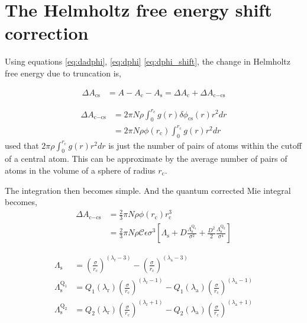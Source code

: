 \documentclass[english]{../thermomemo/thermomemo}
\newcommand*{\lb}{\left(}
\newcommand*{\rb}{\right)}
\newcommand{\lama}{\ensuremath{{\lambda_{\text{a}}}}\xspace}
\newcommand{\lamr}{\ensuremath{{\lambda_{\text{r}}}}\xspace}
\newcommand{\cut}{\ensuremath{\text{c}}\xspace}
\newcommand{\cs}{\ensuremath{\text{cs}}\xspace}
\newcommand{\shift}{\ensuremath{\text{s}}\xspace}
\newcommand{\Qone}{\ensuremath{\text{Q}_1}\xspace}
\newcommand{\Qtwo}{\ensuremath{\text{Q}_2}\xspace}
\begin{document}
\section{The Helmholtz free energy shift correction}

Using equations \ref{eq:dadphi}, \ref{eq:dphi} \ref{eq:dphi_shift}, the change in
Helmholtz free energy due to truncation is,

\begin{align}
  \label{eq:dAcs}
  \Delta A_\cs &= A - A_\cut - A_\shift = \Delta A_\cut + \Delta A_{\cut-\cs}
\end{align}

\begin{align}
  \label{eq:dAscs}
  \Delta A_{\cut-\cs}  &= 2 \pi N \rho \int_0^{r_\cut} g\lb r \rb \delta \phi_\cs\lb r\rb r^2 dr \\
  &= 2 \pi N \rho \phi\lb r_\cut\rb \int_0^{r_\cut} g\lb r \rb r^2 dr
\end{align}
\citeauthor{Johnson1993} used that
$2 \pi \rho \int_0^{r_\cut} g\lb r \rb r^2 dr$ is just the number of pairs of
atoms within the cutoff of a central atom. This can be approximate by the
average number of pairs of atoms in the volume of a sphere of radius $r_\cut$.

The integration then becomes simple. And the quantum corrected Mie integral becomes,
\begin{align}
  \label{eq:i_mie_shift}
  \Delta A_{\cut-\cs}  &= \frac{2}{3} \pi N \rho \phi\lb r_\cut\rb r_\cut^3\\
                       &= \frac{2}{3} \pi N \rho \mathcal{C}\epsilon \sigma^3 \left[\Lambda_\shift
                         + D \frac{\Lambda_\shift^{\Qone}}{\sigma^2}
                         + \frac{D^2}{2} \frac{\Lambda_\shift^{\Qtwo}}{\sigma^4}\right]
\end{align}

\begin{align}
  \label{eq:lambda_shift}
  \Lambda_\shift  &= \lb\frac{\sigma}{r_\cut} \rb^{\lb\lamr-3\rb} - \lb\frac{\sigma}{r_\cut} \rb^{\lb \lama - 3\rb} \\
  \Lambda_\shift^{\Qone} &= Q_1\lb\lamr\rb\lb\frac{\sigma}{r_\cut} \rb^{\lb\lamr-1\rb} - Q_1\lb\lama\rb\lb\frac{\sigma}{r_\cut} \rb^{\lb \lama - 1\rb}\\
  \Lambda_\shift^{\Qtwo} &= Q_2\lb\lamr\rb\lb\frac{\sigma}{r_\cut} \rb^{\lb\lamr+1\rb} - Q_2\lb\lama\rb\lb\frac{\sigma}{r_\cut} \rb^{\lb \lama + 1\rb}
\end{align}
\end{document}
